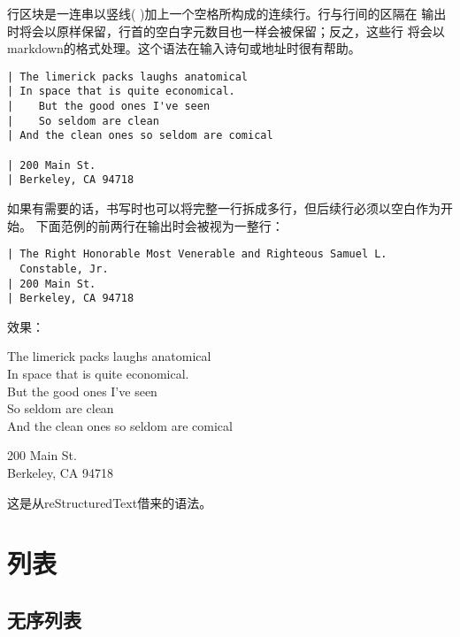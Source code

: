 \documentclass[cn]{elegantbook}
\begin{document}
行区块是一连串以竖线(
\textbar)加上一个空格所构成的连续行。行与行间的区隔在
输出时将会以原样保留，行首的空白字元数目也一样会被保留；反之，这些行
将会以markdown的格式处理。这个语法在输入诗句或地址时很有帮助。

\begin{lstlisting}
| The limerick packs laughs anatomical
| In space that is quite economical.
|    But the good ones I've seen
|    So seldom are clean
| And the clean ones so seldom are comical

| 200 Main St.
| Berkeley, CA 94718
\end{lstlisting}

如果有需要的话，书写时也可以将完整一行拆成多行，但后续行必须以空白作为开始。
下面范例的前两行在输出时会被视为一整行：

\begin{lstlisting}
| The Right Honorable Most Venerable and Righteous Samuel L.
  Constable, Jr.
| 200 Main St.
| Berkeley, CA 94718
\end{lstlisting}

效果：

The limerick packs laughs anatomical\\
In space that is quite economical.\\
\hspace*{0.333em}\hspace*{0.333em}\hspace*{0.333em}But the good ones
I've seen\\
\hspace*{0.333em}\hspace*{0.333em}\hspace*{0.333em}So seldom are clean\\
And the clean ones so seldom are comical

200 Main St.\\
Berkeley, CA 94718

这是从reStructuredText借来的语法。

\hypertarget{ux5217ux8868}{%
\section{列表}\label{ux5217ux8868}}

\hypertarget{ux65e0ux5e8fux5217ux8868}{%
\subsection{无序列表}\label{ux65e0ux5e8fux5217ux8868}}
\end{document}
